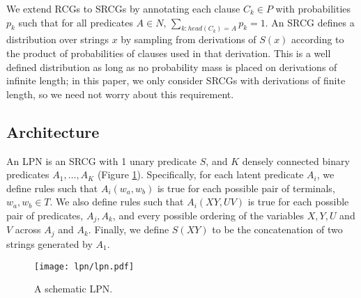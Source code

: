 \documentclass[11pt, twocolumn]{article}
\begin{document}
We extend RCGs to SRCGs by annotating each clause $C_k \in P$ with
probabilities $p_k$ such that for all predicates ${A \in N, \,
  \sum_{k:head(C_k)=A} p_k = 1}$. An SRCG defines a distribution over
strings $x$ by sampling from derivations of $S(x)$ according to the
product of probabilities of clauses used in that derivation. This is a
well defined distribution as long as no probability mass is placed on
derivations of infinite length; in this paper, we only consider SRCGs
with derivations of finite length, so we need not worry about this
requirement.

\subsection{Architecture}

An LPN is an SRCG with 1 unary predicate $S$, and $K$ densely
connected binary predicates $A_1, \dots, A_K$ (Figure
\ref{fig:architecture}).  Specifically, for each latent predicate
$A_i$, we define rules such that $A_i(w_a,w_b)$ is true for each
possible pair of terminals, $w_a,w_b \in T$. We also define rules such
that $A_i(XY,UV)$ is true for each possible pair of predicates,
$A_j,A_k$, and every possible ordering of the variables $X,Y,U$ and
$V$ across $A_j$ and $A_k$. Finally, we define $S(XY)$ to be the
concatenation of two strings generated by $A_1$.
 
\begin{figure}[t]
		\texttt{[image: lpn/lpn.pdf]}
		\caption{A schematic LPN.}
		\label{fig:architecture}
\end{figure}


\end{document}
